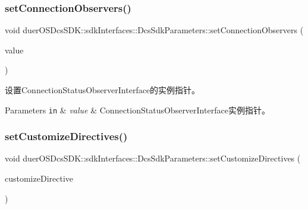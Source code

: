 \subsubsection{\texorpdfstring{set\+Connection\+Observers()}{setConnectionObservers()}}
{\footnotesize\ttfamily void duer\+O\+S\+Dcs\+S\+D\+K\+::sdk\+Interfaces\+::\+Dcs\+Sdk\+Parameters\+::set\+Connection\+Observers (\begin{DoxyParamCaption}\item[{std\+::shared\+\_\+ptr$<$ \hyperlink{classduerOSDcsSDK_1_1sdkInterfaces_1_1ConnectionStatusObserverInterface}{sdk\+Interfaces\+::\+Connection\+Status\+Observer\+Interface} $>$}]{value }\end{DoxyParamCaption})\hspace{0.3cm}{\ttfamily [inline]}}



设置\+Connection\+Status\+Observer\+Interface的实例指针。 


\begin{DoxyParams}[1]{Parameters}
\mbox{\tt in}  & {\em value} & Connection\+Status\+Observer\+Interface实例指针。 \\
\hline
\end{DoxyParams}
\mbox{\label{structduerOSDcsSDK_1_1sdkInterfaces_1_1DcsSdkParameters_ad1c083f3e2cd3c5be0e8cb96625bb5a0}} 
\subsubsection{\texorpdfstring{set\+Customize\+Directives()}{setCustomizeDirectives()}}
{\footnotesize\ttfamily void duer\+O\+S\+Dcs\+S\+D\+K\+::sdk\+Interfaces\+::\+Dcs\+Sdk\+Parameters\+::set\+Customize\+Directives (\begin{DoxyParamCaption}\item[{std\+::vector$<$ std\+::pair$<$ std\+::string, std\+::string $>$$>$ \&}]{customize\+Directive }\end{DoxyParamCaption})\hspace{0.3cm}{\ttfamily [inline]}}



